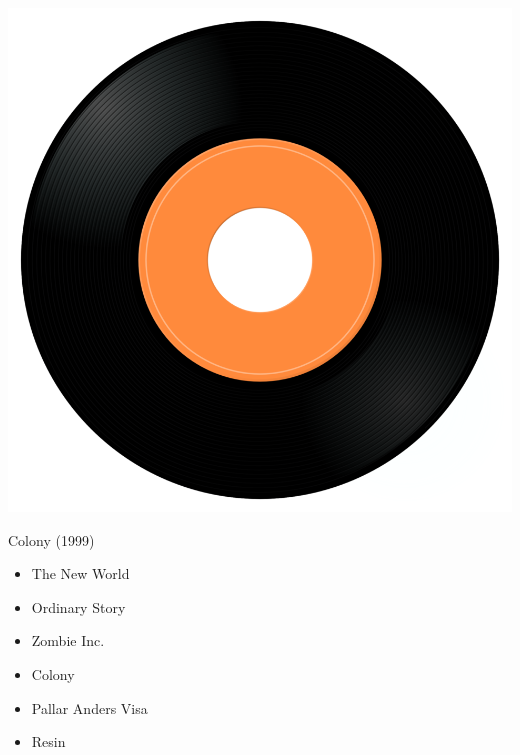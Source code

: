 \begin{minipage}[t]{0.25\textwidth}\vspace{0pt}
\captionsetup{type=figure}
\includegraphics[width=\textwidth]{Images/cover.png}
\caption*{Colony (1999)}
\end{minipage}
\begin{minipage}[t]{0.25\textwidth}\vspace{0pt}
\begin{itemize}[nosep,leftmargin=1em,labelwidth=*,align=left]
	\setlength{\itemsep}{0pt}
	\item The New World
	\item Ordinary Story
	\item Zombie Inc.
	\item Colony
	\item Pallar Anders Visa
	\item Resin
\end{itemize}
\end{minipage}
